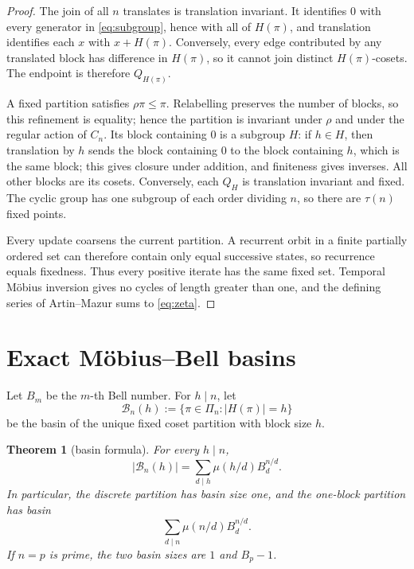 \documentclass[11pt,a4paper]{amsart}
\newtheorem{theorem}{Theorem}[section]
\theoremstyle{definition}
\theoremstyle{remark}
\newcommand{\Cn}{C_n}
\newcommand{\Pin}{\Pi_n}
\newcommand{\card}[1]{\lvert #1\rvert}
\begin{document}
\begin{proof}
The join of all $n$ translates is translation invariant.  It identifies
$0$ with every generator in \eqref{eq:subgroup}, hence with all of
$H(\pi)$, and translation identifies each $x$ with $x+H(\pi)$.  Conversely,
every edge contributed by any translated block has difference in
$H(\pi)$, so it cannot join distinct $H(\pi)$-cosets.  The endpoint is
therefore $Q_{H(\pi)}$.

A fixed partition satisfies $\rho\pi\leq\pi$.  Relabelling preserves the
number of blocks, so this refinement is equality; hence the partition is
invariant under $\rho$ and under the regular action of $\Cn$.  Its block
containing $0$ is a subgroup $H$: if $h\in H$, then
translation by $h$ sends the block containing $0$ to the block containing
$h$, which is the same block; this gives closure under addition, and
finiteness gives inverses.  All other blocks are its cosets.  Conversely,
each $Q_H$ is translation invariant and fixed.  The cyclic group has one
subgroup of each order dividing $n$, so there are $\tau(n)$ fixed points.

Every update coarsens the current partition.  A recurrent orbit in a finite
partially ordered set can therefore contain only equal successive states,
so recurrence equals fixedness.  Thus every positive iterate has the same
fixed set.  Temporal M\"obius inversion gives no cycles of length greater
than one, and the defining series of Artin--Mazur \cite{ArtinMazur1965}
sums to \eqref{eq:zeta}.
\end{proof}

\section{Exact M\"obius--Bell basins}\label{sec:basins}

Let $B_m$ be the $m$-th Bell number.  For $h\mid n$, let
\[
 \mathcal B_n(h):=\{\pi\in\Pin:\card{H(\pi)}=h\}
\]
be the basin of the unique fixed coset partition with block size $h$.

\begin{theorem}[basin formula]\label{thm:basins}
For every $h\mid n$,
\begin{equation}\label{eq:basin}
 \boxed{\displaystyle
 \card{\mathcal B_n(h)}
 =\sum_{d\mid h}\mu(h/d)B_d^{n/d}.}
\end{equation}
In particular, the discrete partition has basin size one, and the one-block
partition has basin
\[
       \sum_{d\mid n}\mu(n/d)B_d^{n/d}.
\]
If $n=p$ is prime, the two basin sizes are $1$ and $B_p-1$.
\end{theorem}
\end{document}
